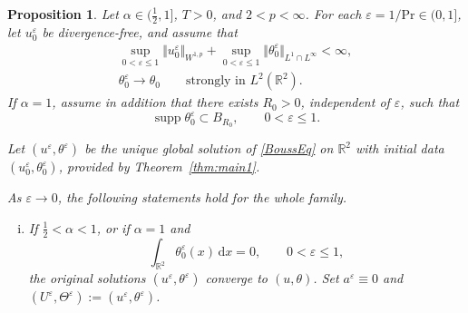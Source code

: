 \documentclass[reqno,11pt,a4paper]{amsart}
\newtheorem{proposition}[theorem]{Proposition}
\newcommand{\dd}{\mathrm{d}}
\begin{document}
\begin{proposition}\label{prop:weak-limit-R2}
Let $\alpha\in(\frac12,1]$, $T>0$, and $2<p<\infty$.
For each $\varepsilon=1/\mathrm{Pr}\in(0,1]$,
let $u_0^\varepsilon$ be divergence-free, and assume that
\begin{equation}\label{eq:inidata-eps-assum}
\begin{gathered}
  \sup_{0<\varepsilon\leq1}
  \Vert u_0^\varepsilon\Vert _{W^{1,p}}
  +
  \sup_{0<\varepsilon\leq1}
  \Vert \theta_0^\varepsilon\Vert _{L^1\cap L^\infty}
  <\infty,
  \\
  \theta_0^\varepsilon\longrightarrow\theta_0
  \qquad\text{strongly in }L^2(\mathbb R^2).
\end{gathered}
\end{equation}
If $\alpha=1$, assume in addition that there exists
$R_0>0$, independent of $\varepsilon$, such that
\begin{equation}\label{eq:the-eps-supp-assum}
  \operatorname{supp}\theta_0^\varepsilon
  \subset B_{R_0},
  \qquad 0<\varepsilon\leq1.
\end{equation}

Let $(u^\varepsilon,\theta^\varepsilon)$ be the unique
global solution of \eqref{BoussEq} on $\mathbb R^2$
with initial data $(u_0^\varepsilon,\theta_0^\varepsilon)$,
provided by Theorem~\ref{thm:main1}.

As $\varepsilon\to0$,
the following statements hold for the whole family.
\begin{enumerate}[(i)]
\item
If $\frac12<\alpha<1$, or if $\alpha=1$ and
\begin{equation}\label{eq:zero-mean-family}
  \int_{\mathbb R^2}\theta_0^\varepsilon(x)\,\dd x=0,
  \qquad 0<\varepsilon\leq1,
\end{equation}
the original solutions $(u^\varepsilon,\theta^\varepsilon)$
converge to $(u,\theta)$.
Set $a^\varepsilon\equiv0$ and
$(U^\varepsilon,\Theta^\varepsilon)
:=(u^\varepsilon,\theta^\varepsilon)$.


\end{enumerate}
\end{proposition}
\end{document}
